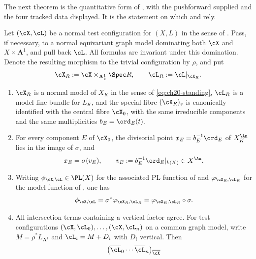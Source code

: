 The next theorem is the quantitative form of
, with the pushforward supplied and the
four tracked data displayed.  It is the statement on which
 and  rely.

\begin{theorem}
\label{thm:ch30-gauss-model-dictionary}
Let $(\cX,\cL)$ be a normal test configuration for $(X,L)$ in the sense
of .  Pass, if necessary, to a normal equivariant graph model dominating
both $\cX$ and $X\times\mathbf A^1$, and pull back $\cL$.
All formulas are invariant under this domination.
Denote the resulting morphism to the trivial configuration by $\rho$,
and put
\[
 \cX_R:=\cX\times_{\mathbf A^1_k}\Spec R,
 \qquad
 \cL_R:=\cL|_{\cX_R} .
\]
\begin{enumerate}
\item\label{itm:ch30-gmd:model}
$\cX_R$ is a normal model of $X_K$ in the sense of
\eqref{eq:ch20-standing}, $\cL_R$ is a model line bundle for $L_K$, and
the special fibre $(\cX_R)_s$ is canonically identified with the central
fibre $\cX_0$, with the same irreducible components and the same
multiplicities $b_E=\ord_E(t)$.
\item\label{itm:ch30-gmd:points}
For every component $E$ of $\cX_0$, the divisorial point
$x_E=b_E^{-1}\ord_E$ of $X_K^{\An}$ lies in the image of $\sigma$, and
\begin{equation}
\label{eq:ch30-gauss-divisorial}
 x_E=\sigma(v_E),
 \qquad v_E:=b_E^{-1}\ord_E|_{k(X)}\in X^{\An} .
\end{equation}
\item\label{itm:ch30-gmd:function}
Writing $\phi_{\cX,\cL}\in\PL(X)$ for the associated PL
function of  and $\varphi_{\cX_R,\cL_R}$ for the
model function of , one has
\begin{equation}
\label{eq:ch30-gauss-pl}
 \phi_{\cX,\cL}=\sigma^*\varphi_{\cX_R,\cL_R}
 =\varphi_{\cX_R,\cL_R}\circ\sigma .
\end{equation}
\item\label{itm:ch30-gmd:intersections}
All intersection terms containing a vertical factor agree.
For test configurations $(\cX,\cL_0),\ldots,(\cX,\cL_n)$
on a common graph model, write $M=\rho^*L_{\mathbf A^1}$ and
$\cL_i=M+D_i$ with $D_i$ vertical.  Then
\begin{equation}
\label{eq:ch30-gauss-intersection}
 \bigl(\overline{\cL}_0\cdots\overline{\cL}_n\bigr)_{\overline\cX}

\end{equation}
\end{enumerate}
\end{theorem}
